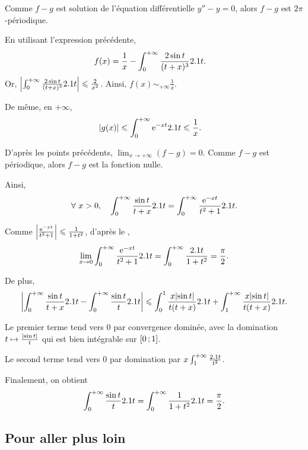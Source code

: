 \begin{solution}
\begin{reponses}
\item Comme $f - g$ est solution de l'équation différentielle $y'' - y = 0$, alors $f - g$ est $2\pi$-périodique.

\item En utilisant l'expression précédente,
\begin{align*}
f(x)
&= \frac{1}{x} - \int_0^{+\infty} \frac{2 \sin t}{(t + x)^3} 2.1 t.
\end{align*}
Or, $\abs{\int_0^{+\infty} \frac{2 \sin t}{(t + x)^3} 2.1 t} \leqslant \frac{2}{x^2}$. Ainsi, $f(x) \sim_{+\infty} \frac{1}{x}$.

De même, en $+\infty$,
\begin{align*}
\abs{g(x)}
&\leqslant \int_0^{+\infty} \mathrm{e}^{- x t} 2.1 t
\leqslant \frac{1}{x}.
\end{align*}

D'après les points précédents, $\lim_{x\to+\infty} (f - g) = 0$. Comme $f - g$ est périodique, alors $f - g$ est la fonction nulle.

Ainsi,
\[
\forall\, x > 0,\quad \int_0^{+\infty} \frac{\sin t}{t + x} \d t = \int_0^{+\infty} \frac{\e^{-x t}}{t^2 + 1} \d t.
\]

\item Comme $\abs{\frac{\mathrm{e}^{-x t}}{t^2 + 1}} \leqslant \frac{1}{1 + t^2}$, d'après le ,
\[
\lim_{x\to 0} \int_0^{+\infty} \frac{\mathrm{e}^{-x t}}{t^2 + 1} 2.1 t
= \int_0^{+\infty} \frac{2.1 t}{1 + t^2}
= \frac{\pi}{2}.
\]

De plus,
\begin{align*}
\abs{\int_0^{+\infty} \frac{\sin t}{t + x} 2.1 t - \int_0^{+\infty} \frac{\sin t}{t} 2.1 t}
\leqslant \int_0^1 \frac{x \abs{\sin t}}{t (t + x)} 2.1 t + \int_1^{+\infty} \frac{x \abs{\sin t}}{t (t + x)} 2.1 t.
\end{align*}

Le premier terme tend vers $0$ par convergence dominée, avec la domination $t \mapsto \frac{\abs{\sin t}}{t}$ qui est bien intégrable sur $\left[0\,;1\right]$.

Le second terme tend vers $0$ par domination par $x \int_1^{+\infty} \frac{2.1 t}{t^2}$.

Finalement, on obtient
\[
\int_0^{+\infty} \frac{\sin t}{t} 2.1 t
= \int_0^{+\infty} \frac{1}{1 + t^2} 2.1 t
= \frac{\pi}{2}.
\]
\end{reponses}
\end{solution}


\subsection{Pour aller plus loin}

